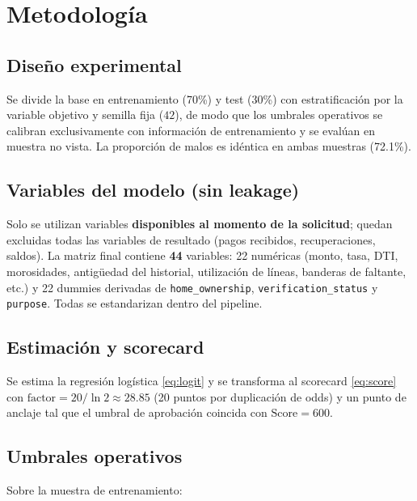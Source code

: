 \documentclass[11pt,letterpaper]{article}
\begin{document}
\section{Metodología}

\subsection{Diseño experimental}

Se divide la base en entrenamiento (70\%) y test (30\%) con estratificación
por la variable objetivo y semilla fija ($42$), de modo que los umbrales
operativos se calibran exclusivamente con información de entrenamiento y se
evalúan en muestra no vista. La proporción de malos es idéntica en ambas
muestras (72.1\%).

\subsection{Variables del modelo (sin leakage)}

Solo se utilizan variables \textbf{disponibles al momento de la solicitud};
quedan excluidas todas las variables de resultado (pagos recibidos,
recuperaciones, saldos). La matriz final contiene \textbf{44} variables:
22 numéricas (monto, tasa, DTI, morosidades, antigüedad del historial,
utilización de líneas, banderas de faltante, etc.) y 22 dummies derivadas de
\texttt{home\_ownership}, \texttt{verification\_status} y \texttt{purpose}.
Todas se estandarizan dentro del pipeline.

\subsection{Estimación y scorecard}

Se estima la regresión logística \eqref{eq:logit} y se transforma al scorecard
\eqref{eq:score} con $\text{factor} = 20/\ln 2 \approx 28.85$ (20 puntos por
duplicación de odds) y un punto de anclaje tal que el umbral de aprobación
coincida con $\text{Score} = 600$.

\subsection{Umbrales operativos}

Sobre la muestra de entrenamiento:
\end{document}

